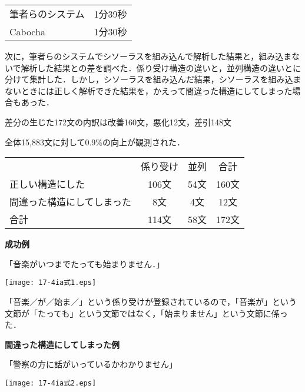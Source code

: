 \documentclass[japanese]{jnlp_1.4}
\begin{document}
\vspace{0.3zw}
\begin{tabular}{lc}
筆者らのシステム & 1分39秒 \\
Cabocha & 1分30秒
\end{tabular}
\vspace{0.3zw}

次に，筆者らのシステムでシソーラスを組み込んで解析した結果と，組み込まないで解析した結果との差を調べた．係り受け構造の違いと，並列構造の違いとに分けて集計した．しかし，シソーラスを組み込んだ結果，シソーラスを組み込まないときには正しく解析できた結果を，かえって間違った構造にしてしまった場合もあった．

差分の生じた172文の内訳は改善160文，悪化12文，差引148文

全体15,883文に対して0.9\%の向上が観測された．

\vspace{0.3zw}
\begin{tabular}{lccc}
	& 係り受け & 並列 & 合計 \\
正しい構造にした & 106文 & 54文 & 160文 \\
間違った構造にしてしまった & \phantom{00}8文 & \phantom{0}4文 & \phantom{0}12文 \\
合計 & 114文 & 58文 & 172文 \\
\end{tabular}
\vspace{0.3zw}

{\bfseries 成功例}

「音楽がいつまでたっても始まりません．」

\vspace{1\baselineskip}
\begin{center}
\texttt{[image: 17-4ia式1.eps]}
\end{center}
\vspace{1\baselineskip}

「音楽／が／始ま／」という係り受けが登録されているので，「音楽が」という文節が「たっても」という文節ではなく，「始まりません」という文節に係った．

{\bfseries 間違った構造にしてしまった例}

「警察の方に話がいっているかわかりません」

\vspace{1\baselineskip}
\begin{center}
\texttt{[image: 17-4ia式2.eps]}
\end{center}
\vspace{1\baselineskip}
\end{document}
